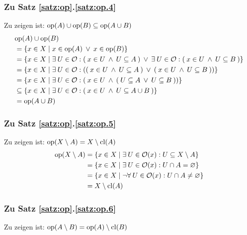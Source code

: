 \subsubsection{Zu Satz \ref{satz:op}.\ref{satz:op.4}}\label{anh:op.4}
    Zu zeigen ist: $\text{op}(A) \cup \text{op}(B) \subseteq \text{op}(A \cup B)$
    \begin{align*}
        &\text{op}(A) \cup \text{op}(B) \\
        &= \{x \in X \mid x \in \text{op}(A) \:\lor\: x \in \text{op}(B)\} \\
        &= \{x \in X \mid \exists\: U \in \mathcal{O} : (\: x \in U \:\land\: U \subseteq A \:) \:\lor\: \exists\: U \in \mathcal{O} : (\: x \in U \:\land\: U \subseteq B \:) \} \\
        &= \{x \in X \mid \exists\: U \in \mathcal{O} : ((\: x \in U \:\land\: U \subseteq A \:) \:\lor\: (\: x \in U \:\land\: U \subseteq B \:)) \} \\
        &= \{x \in X \mid \exists\: U \in \mathcal{O} : (\: x \in U \:\land\: (\: U \subseteq A \:\lor\: U \subseteq B \:)) \} \\
        &\subseteq \{x \in X \mid \exists\: U \in \mathcal{O} : (\: x \in U \:\land\: U \subseteq A \cup B \:) \} \\
        &= \text{op}(A \cup B)
    \end{align*}
    
    
\subsubsection{Zu Satz \ref{satz:op}.\ref{satz:op.5}} 
    Zu zeigen ist: $\text{op}(X \setminus A) = X \setminus \text{cl}(A)$ \\
    \begin{align*}
        \text{op}(X \setminus A)
        &= \{x \in X \mid \exists\: U \in \mathcal{O}(x) : U \subseteq X \setminus A \}\\
        &= \{x \in X \mid \exists\: U \in \mathcal{O}(x) : U \cap A = \varnothing\}\\
        &= \{x \in X \mid \neg \forall\: U \in \mathcal{O}(x) : U \cap A \neq \varnothing \}\\
        &= X \setminus \text{cl}(A)
    \end{align*}


\subsubsection{Zu Satz \ref{satz:op}.\ref{satz:op.6}}\label{anh:op.5}	
    Zu zeigen ist: $\text{op}(A \setminus B) = \text{op}(A) \setminus \text{cl}(B)$\\

